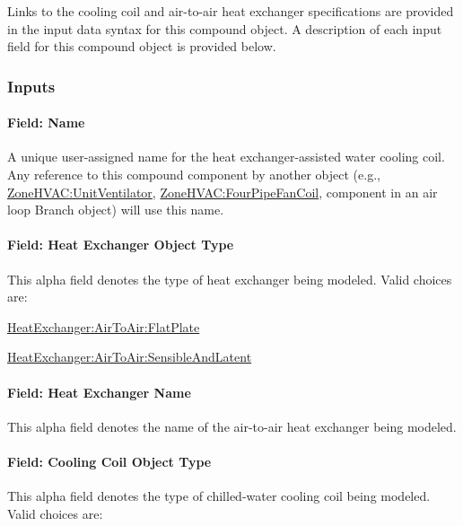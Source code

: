 Links to the cooling coil and air-to-air heat exchanger specifications are provided in the input data syntax for this compound object. A description of each input field for this compound object is provided below.

\subsubsection{Inputs}\label{inputs-26}

\paragraph{Field: Name}\label{field-name-25-000}

A unique user-assigned name for the heat exchanger-assisted water cooling coil. Any reference to this compound component by another object (e.g., \hyperref[zonehvacunitventilator]{ZoneHVAC:UnitVentilator}, \hyperref[zonehvacfourpipefancoil]{ZoneHVAC:FourPipeFanCoil}, component in an air loop Branch object) will use this name.

\paragraph{Field: Heat Exchanger Object Type}\label{field-heat-exchanger-object-type-1}

This alpha field denotes the type of heat exchanger being modeled. Valid choices are:

\hyperref[heatexchangerairtoairflatplate]{HeatExchanger:AirToAir:FlatPlate}

\hyperref[heatexchangerairtoairsensibleandlatent]{HeatExchanger:AirToAir:SensibleAndLatent}

\paragraph{Field: Heat Exchanger Name}\label{field-heat-exchanger-name-1}

This alpha field denotes the name of the air-to-air heat exchanger being modeled.

\paragraph{Field: Cooling Coil Object Type}\label{field-cooling-coil-object-type-2}

This alpha field denotes the type of chilled-water cooling coil being modeled. Valid choices are:

